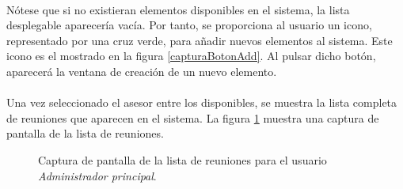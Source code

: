   \paragraph{}Nótese que si no existieran elementos disponibles en el sistema,
  la lista desplegable aparecería vacía. Por tanto, se proporciona al usuario
  un icono, representado por una cruz verde, para añadir nuevos elementos al
  sistema. Este icono es el mostrado en la figura \ref{capturaBotonAdd}. Al
  pulsar dicho botón, aparecerá la ventana de creación de un nuevo elemento.

  \paragraph{}Una vez seleccionado el asesor entre los disponibles, se muestra
  la lista completa de reuniones que aparecen en el sistema. La figura
  \ref{capturaPantallaListaReunionesAdminPrincipal} muestra una captura de
  pantalla de la lista de reuniones.

  \begin{figure}[!ht]
    \begin{center}
      \caption{Captura de pantalla de la lista de reuniones para el usuario \textit{Administrador principal}.}
      \label{capturaPantallaListaReunionesAdminPrincipal}
    \end{center}
  \end{figure}
